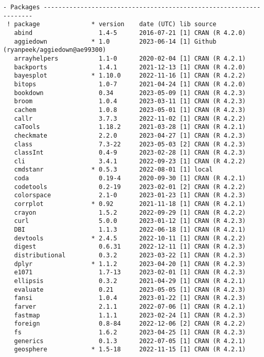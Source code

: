\documentclass[twoside,12pt,final]{ucthesis-CA2012}
\begin{document}
\begin{ucmainmatter}
\begin{verbatim}
- Packages -------------------------------------------------------------------
 ! package              * version    date (UTC) lib source
   abind                  1.4-5      2016-07-21 [1] CRAN (R 4.2.0)
   aggiedown            * 1.0        2023-06-14 [1] Github (ryanpeek/aggiedown@ae99300)
   arrayhelpers           1.1-0      2020-02-04 [1] CRAN (R 4.2.1)
   backports              1.4.1      2021-12-13 [1] CRAN (R 4.2.0)
   bayesplot            * 1.10.0     2022-11-16 [1] CRAN (R 4.2.2)
   bitops                 1.0-7      2021-04-24 [1] CRAN (R 4.2.0)
   bookdown               0.34       2023-05-09 [1] CRAN (R 4.2.3)
   broom                  1.0.4      2023-03-11 [1] CRAN (R 4.2.3)
   cachem                 1.0.8      2023-05-01 [1] CRAN (R 4.2.3)
   callr                  3.7.3      2022-11-02 [1] CRAN (R 4.2.2)
   caTools                1.18.2     2021-03-28 [1] CRAN (R 4.2.1)
   checkmate              2.2.0      2023-04-27 [1] CRAN (R 4.2.3)
   class                  7.3-22     2023-05-03 [2] CRAN (R 4.2.3)
   classInt               0.4-9      2023-02-28 [1] CRAN (R 4.2.3)
   cli                    3.4.1      2022-09-23 [1] CRAN (R 4.2.2)
   cmdstanr             * 0.5.3      2022-08-01 [1] local
   coda                   0.19-4     2020-09-30 [1] CRAN (R 4.2.1)
   codetools              0.2-19     2023-02-01 [2] CRAN (R 4.2.2)
   colorspace             2.1-0      2023-01-23 [1] CRAN (R 4.2.3)
   corrplot             * 0.92       2021-11-18 [1] CRAN (R 4.2.1)
   crayon                 1.5.2      2022-09-29 [1] CRAN (R 4.2.2)
   curl                   5.0.0      2023-01-12 [1] CRAN (R 4.2.3)
   DBI                    1.1.3      2022-06-18 [1] CRAN (R 4.2.1)
   devtools             * 2.4.5      2022-10-11 [1] CRAN (R 4.2.2)
   digest                 0.6.31     2022-12-11 [1] CRAN (R 4.2.3)
   distributional         0.3.2      2023-03-22 [1] CRAN (R 4.2.3)
   dplyr                * 1.1.2      2023-04-20 [1] CRAN (R 4.2.3)
   e1071                  1.7-13     2023-02-01 [1] CRAN (R 4.2.3)
   ellipsis               0.3.2      2021-04-29 [1] CRAN (R 4.2.1)
   evaluate               0.21       2023-05-05 [1] CRAN (R 4.2.3)
   fansi                  1.0.4      2023-01-22 [1] CRAN (R 4.2.3)
   farver                 2.1.1      2022-07-06 [1] CRAN (R 4.2.1)
   fastmap                1.1.1      2023-02-24 [1] CRAN (R 4.2.3)
   foreign                0.8-84     2022-12-06 [2] CRAN (R 4.2.2)
   fs                     1.6.2      2023-04-25 [1] CRAN (R 4.2.3)
   generics               0.1.3      2022-07-05 [1] CRAN (R 4.2.1)
   geosphere            * 1.5-18     2022-11-15 [1] CRAN (R 4.2.1)

\end{verbatim}
\end{ucmainmatter}
\end{document}
